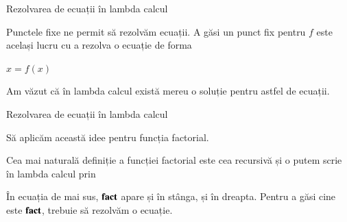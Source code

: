 \documentclass[xcolor=pdftex,romanian,colorlinks]{beamer}
\begin{document}
\begin{frame}{Rezolvarea de ecuații în lambda calcul}

Punctele fixe ne permit să rezolvăm ecuații. A găsi un punct fix pentru $f$ este același lucru cu a rezolva o ecuație de forma
\vspace{-.2cm}
\begin{center}
$x = f(x)$
\end{center}
\vspace{-.2cm}

Am văzut că în lambda calcul există mereu o soluție pentru astfel de ecuații.
\end{frame}

\begin{frame}{Rezolvarea de ecuații în lambda calcul}

Să aplicăm această idee pentru funcția factorial. 

Cea mai naturală definiție a funcției factorial este cea recursivă și o putem scrie în lambda calcul prin
\begin{center}
\end{center}

În ecuația de mai sus, $\mathbf{fact}$ apare și în stânga, și în dreapta. Pentru a găsi cine este $\mathbf{fact}$, trebuie să rezolvăm o ecuație.
\end{frame}
\end{document}
